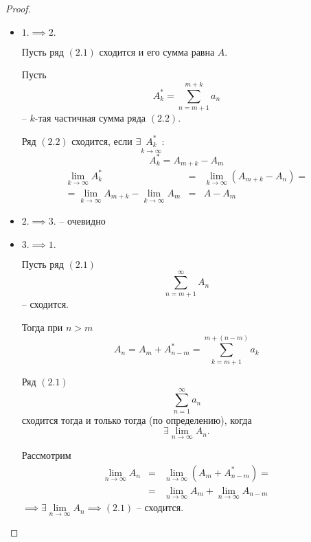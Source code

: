 \documentclass{report}
\theoremstyle{definition}
\begin{document}
\begin{proof}
  \begin{itemize}
    \item $1.\implies 2.$

          Пусть ряд $(2.1)$ сходится и его сумма равна $A$.

          Пусть
          \begin{equation*}
            A_k^* = \sum_{n=m+1}^{m+k}a_n
          \end{equation*}
          -- $k$-тая частичная сумма ряда $(2.2)$.

          Ряд $(2.2)$ сходится, если $\exists \underset{k\rightarrow\infty}{A_k^*}$:
          \begin{equation*}
            A_k^* = A_{m+k} - A_m
          \end{equation*}
          \begin{eqnarray*}
            \underset{k\rightarrow\infty}{\lim}A_k^* &=& \underset{k\rightarrow\infty}{\lim}(A_{m+k} - A_n) = \\
            = \underset{k\rightarrow\infty}{\lim}A_{m+k} - \underset{k\rightarrow\infty}{\lim}A_{m} &=& A - A_m
          \end{eqnarray*}

    \item $2. \implies 3.$ -- очевидно
    \item $3. \implies 1.$

          Пусть ряд $(2.1)$
          \begin{equation*}
            \sum_{n=m+1}^{\infty}A_n
          \end{equation*}
          -- сходится.

          Тогда при $n > m$
          \begin{equation*}
            A_n = A_m + A_{n-m}^* = \sum_{k=m+1}^{m + (n-m)}a_k
          \end{equation*}

          Ряд $(2.1)$
          \begin{equation*}
            \sum_{n=1}^{\infty}a_n
          \end{equation*}
          сходится тогда и только тогда (по определению), когда
          \begin{equation*}
            \exists \underset{n\rightarrow\infty}{\lim}A_n.
          \end{equation*}

          Рассмотрим
          \begin{eqnarray*}
            \underset{n\rightarrow\infty}{\lim}A_n &=& \underset{n\rightarrow\infty}{\lim}(A_m + A_{n-m}^*) = \\
            &=& \underset{n\rightarrow\infty}{\lim}A_m + \underset{n\rightarrow\infty}{\lim}A_{n-m}
          \end{eqnarray*}
          $\implies \exists \underset{n\rightarrow\infty}{\lim}A_n \implies (2.1)$ -- сходится.
  \end{itemize}
\end{proof}
\end{document}
